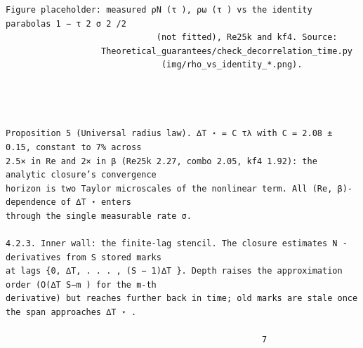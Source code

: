 \documentclass[letterpaper]{article}
\begin{document}
\begin{Verbatim}[fontsize=\fontsize{6.35}{7.15}\selectfont,breaklines=false]
         Figure placeholder: measured ρN (τ ), ρω (τ ) vs the identity parabolas 1 − τ 2 σ 2 /2
                              (not fitted), Re25k and kf4. Source:
                   Theoretical_guarantees/check_decorrelation_time.py
                               (img/rho_vs_identity_*.png).




Proposition 5 (Universal radius law). ∆T ⋆ = C τλ with C = 2.08 ± 0.15, constant to 7% across
2.5× in Re and 2× in β (Re25k 2.27, combo 2.05, kf4 1.92): the analytic closure’s convergence
horizon is two Taylor microscales of the nonlinear term. All (Re, β)-dependence of ∆T ⋆ enters
through the single measurable rate σ.

4.2.3. Inner wall: the finite-lag stencil. The closure estimates N -derivatives from S stored marks
at lags {0, ∆T, . . . , (S − 1)∆T }. Depth raises the approximation order (O(∆T S−m ) for the m-th
derivative) but reaches further back in time; old marks are stale once the span approaches ∆T ⋆ .

                                                   7
\end{Verbatim}
\newpage
\end{document}
